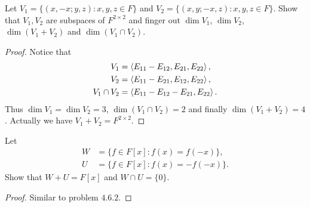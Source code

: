 \begin{pro}%
	Let $V_1=\{(x,-x;y,z)\colon x,y,z\in F\}$ and $V_2=\{(x,y;-x,z)\colon x,y,z\in F\}$. Show that $V_1, V_2$ are subspaces of $F^{2\times 2}$ and finger out $\dim V_1$, $\dim V_2$, $\dim (V_1+V_2)$ and $\dim (V_1\cap V_2)$.
\end{pro}
\begin{proof}
	Notice that 
	\begin{align*}
		V_1&=\left\langle E_{11}-E_{12},E_{21},E_{22}\right\rangle,\\
		V_2&=\left\langle E_{11}-E_{21},E_{12},E_{22}\right\rangle,\\
		V_1\cap V_2&=\left\langle E_{11}-E_{12}-E_{21},E_{22}\right\rangle.
	\end{align*}
	Thus $\dim V_1=\dim V_2=3$, $\dim (V_1\cap V_2)=2$ and finally $\dim(V_1+V_2)=4$. Actually we have $V_1+V_2=F^{2\times 2}$.
\end{proof}

\begin{pro}%
	Let
	\begin{align*}
	W&=\{f\in F[x]\colon f(x)=f(-x)\},\\
	U&=\{f\in F[x]\colon f(x)=-f(-x)\}.
	\end{align*}
	Show that $W+U=F[x]$ and $W\cap U=\{0\}$.
\end{pro}
\begin{proof}
	Similar to problem $4.6.2$.
\end{proof}

